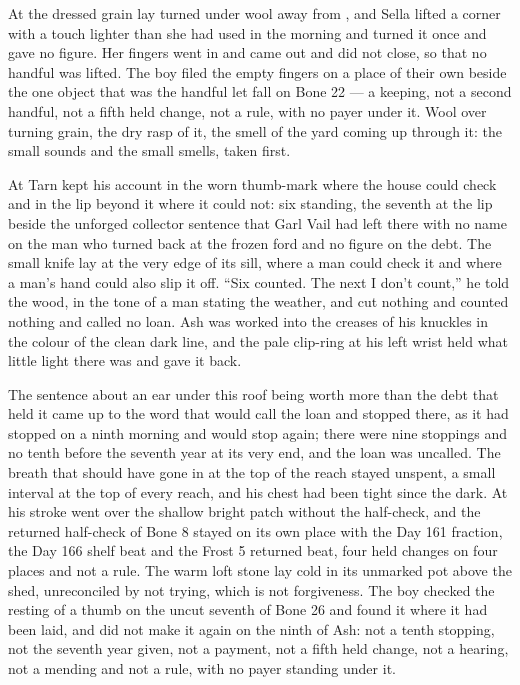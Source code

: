 At  the dressed grain lay turned under wool away from , and Sella lifted a corner with a touch lighter than she had used in the morning and turned it once and gave no figure. Her fingers went in and came out and did not close, so that no handful was lifted. The boy filed the empty fingers on a place of their own beside the one object that was the handful let fall on Bone 22 --- a keeping, not a second handful, not a fifth held change, not a rule, with no payer under it. Wool over turning grain, the dry rasp of it, the smell of the yard coming up through it: the small sounds and the small smells, taken first.

\scenebreak

At  Tarn kept his account in the worn thumb-mark where the house could check and in the lip beyond it where it could not: six standing, the seventh at the lip beside the unforged collector sentence that Garl Vail had left there with no name on the man who turned back at the frozen ford and no figure on the debt. The small knife lay at the very edge of its sill, where a man could check it and where a man's hand could also slip it off. “Six counted. The next I don't count,” he told the wood, in the tone of a man stating the weather, and cut nothing and counted nothing and called no loan. Ash was worked into the creases of his knuckles in the colour of the clean dark line, and the pale clip-ring at his left wrist held what little light there was and gave it back.

The sentence about an ear under this roof being worth more than the debt that held it came up to the word that would call the loan and stopped there, as it had stopped on a ninth morning and would stop again; there were nine stoppings and no tenth before the seventh year at its very end, and the loan was uncalled. The breath that should have gone in at the top of the reach stayed unspent, a small interval at the top of every reach, and his chest had been tight since the dark. At  his stroke went over the shallow bright patch without the half-check, and the returned half-check of Bone 8 stayed on its own place with the Day 161 fraction, the Day 166 shelf beat and the Frost 5 returned beat, four held changes on four places and not a rule. The warm loft stone lay cold in its unmarked pot above the shed, unreconciled by not trying, which is not forgiveness. The boy checked the resting of a thumb on the uncut seventh of Bone 26 and found it where it had been laid, and did not make it again on the ninth of Ash: not a tenth stopping, not the seventh year given, not a payment, not a fifth held change, not a hearing, not a mending and not a rule, with no payer standing under it.

